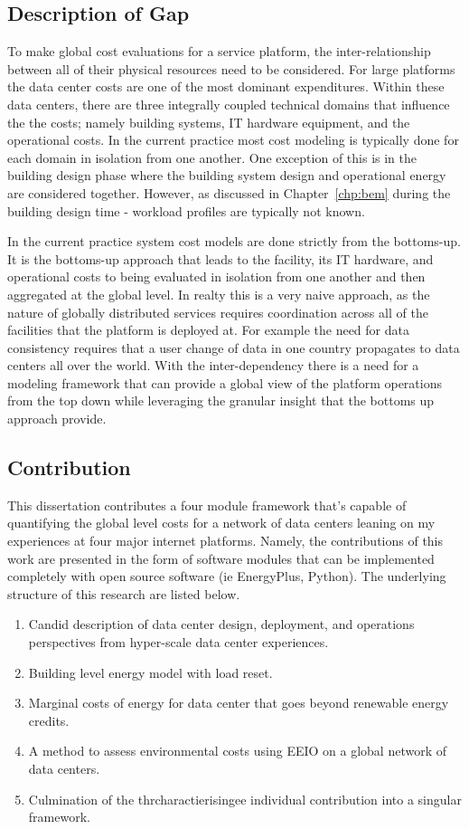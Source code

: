 \subsection{Description of Gap}
To make global cost evaluations for a service platform, the inter-relationship between all of their physical resources need to be considered. For large platforms the data center costs are one of the most dominant expenditures. Within these data centers, there are three integrally coupled technical domains that influence the the costs; namely building systems, IT hardware equipment, and the operational costs. In the current practice most cost modeling is typically done for each domain in isolation from one another. One exception of this is in the building design phase where the building system design and operational energy are considered together. However, as discussed in Chapter~\ref{chp:bem} during the building design time - workload profiles are typically not known. 

In the current practice system cost models are done strictly from the bottoms-up. It is the bottoms-up approach that leads to the facility, its IT hardware, and operational costs to being evaluated in isolation from one another and then aggregated at the global level. In realty this is a very naive approach, as the nature of globally distributed services requires coordination across all of the facilities that the platform is deployed at. For example the need for data consistency requires that a user change of data in one country  propagates to data centers all over the world. With the inter-dependency there is a need for a modeling framework that can provide a global view of the platform operations from the top down while leveraging the granular insight that the bottoms up approach provide. 

\subsection{Contribution}
This dissertation contributes a four module framework that's capable of quantifying the global level costs for a network of data centers leaning on my experiences at four major internet platforms. Namely, the contributions of this work are presented in the form of software modules that can be implemented completely with open source software (ie EnergyPlus, Python). The underlying structure of this research are listed below.

\begin{enumerate}
    \item Candid description of data center design, deployment, and operations perspectives from hyper-scale data center experiences. 
    \item Building level energy model with load reset.
    \item Marginal costs of energy for data center that goes beyond renewable energy credits.
    \item A method to assess environmental costs using EEIO on a global network of data centers.
    \item Culmination of the thrcharactierisingee individual contribution into a singular framework.
\end{enumerate} 

